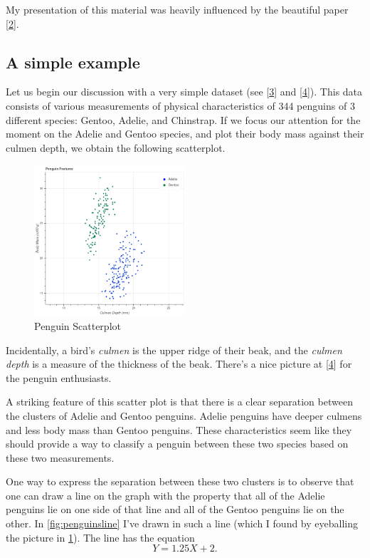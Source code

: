 \documentclass[
]{article}
\begin{document}
My presentation of this material was heavily influenced by the beautiful
paper {[}\protect\hyperlink{ref-bennettDuality}{2}{]}.

\hypertarget{a-simple-example}{%
\subsection{A simple example}\label{a-simple-example}}

Let us begin our discussion with a very simple dataset (see
{[}\protect\hyperlink{ref-penguins}{3}{]} and
{[}\protect\hyperlink{ref-penguindata}{4}{]}). This data consists of
various measurements of physical characteristics of 344 penguins of 3
different species: Gentoo, Adelie, and Chinstrap. If we focus our
attention for the moment on the Adelie and Gentoo species, and plot
their body mass against their culmen depth, we obtain the following
scatterplot.

\begin{figure}
\hypertarget{fig:penguins}{%
\centering
\includegraphics[width=0.5\textwidth,height=\textheight]{../img/penguins.png}
\caption{Penguin Scatterplot}\label{fig:penguins}
}
\end{figure}

Incidentally, a bird's \emph{culmen} is the upper ridge of their beak,
and the \emph{culmen depth} is a measure of the thickness of the beak.
There's a nice picture at {[}\protect\hyperlink{ref-penguindata}{4}{]}
for the penguin enthusiasts.

A striking feature of this scatter plot is that there is a clear
separation between the clusters of Adelie and Gentoo penguins. Adelie
penguins have deeper culmens and less body mass than Gentoo penguins.
These characteristics seem like they should provide a way to classify a
penguin between these two species based on these two measurements.

One way to express the separation between these two clusters is to
observe that one can draw a line on the graph with the property that all
of the Adelie penguins lie on one side of that line and all of the
Gentoo penguins lie on the other. In \cref{fig:penguinsline} I've drawn
in such a line (which I found by eyeballing the picture in
\cref{fig:penguins}). The line has the equation \[
Y = 1.25X+2.
\]
\end{document}
